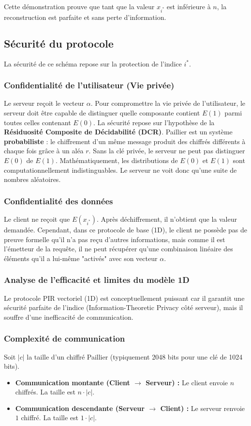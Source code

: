 \documentclass[12pt,a4paper]{report}
\begin{document}
Cette démonstration prouve que tant que la valeur $x_{i^*}$ est inférieure à $n$, la reconstruction est parfaite et sans perte d'information.


\subsection{Sécurité du protocole}
La sécurité de ce schéma repose sur la protection de l'indice $i^*$.

\subsubsection{Confidentialité de l'utilisateur (Vie privée)}
Le serveur reçoit le vecteur $\alpha$. Pour compromettre la vie privée de l'utilisateur, le serveur doit être capable de distinguer quelle composante contient $E(1)$ parmi toutes celles contenant $E(0)$. 
La sécurité repose sur l'hypothèse de la \textbf{Résiduosité Composite de Décidabilité (DCR)}. Paillier est un système \textbf{probabiliste} : le chiffrement d'un même message produit des chiffrés différents à chaque fois grâce à un aléa $r$. 
Sans la clé privée, le serveur ne peut pas distinguer $E(0)$ de $E(1)$. Mathématiquement, les distributions de $E(0)$ et $E(1)$ sont computationnellement indistinguables. Le serveur ne voit donc qu'une suite de nombres aléatoires.

\subsubsection{Confidentialité des données}
Le client ne reçoit que $E(x_{i^*})$. Après déchiffrement, il n'obtient que la valeur demandée. Cependant, dans ce protocole de base (1D), le client ne possède pas de preuve formelle qu'il n'a pas reçu d'autres informations, mais comme il est l'émetteur de la requête, il ne peut récupérer qu'une combinaison linéaire des éléments qu'il a lui-même "activés" avec son vecteur $\alpha$.


\subsubsection{Analyse de l'efficacité et limites du modèle 1D}

Le protocole PIR vectoriel (1D) est conceptuellement puissant car il garantit une sécurité parfaite de l'indice (Information-Theoretic Privacy côté serveur), mais il souffre d'une inefficacité de communication.

\subsubsection{Complexité de communication}
Soit $|c|$ la taille d'un chiffré Paillier (typiquement 2048 bits pour une clé de 1024 bits).
\begin{itemize}
    \item \textbf{Communication montante (Client $\to$ Serveur) :} Le client envoie $n$ chiffrés. La taille est $n \cdot |c|$.
    \item \textbf{Communication descendante (Serveur $\to$ Client) :} Le serveur renvoie $1$ chiffré. La taille est $1 \cdot |c|$.
\end{itemize}
\end{document}
